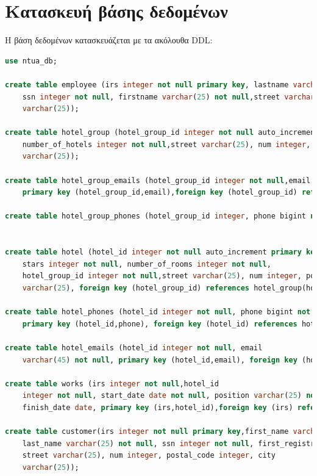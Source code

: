 \documentclass[a4paper,oneside, 11pt]{article}
\begin{document}
\section{Κατασκευή βάσης δεδομένων}
Η βάση δεδομένων κατασκευάζεται με τα ακόλουθα DDL:
\begin{lstlisting}[language=SQL]
use ntua_db;

create table employee (irs integer not null primary key, lastname varchar(25) not null,
	ssn integer not null, firstname varchar(25) not null,street varchar(25), num integer, postal_code integer, city
	varchar(25));

create table hotel_group (hotel_group_id integer not null auto_increment primary key,name varchar(25) not null,
	number_of_hotels integer not null,street varchar(25), num integer, postal_code integer, city
	varchar(25)); 

create table hotel_group_emails (hotel_group_id integer not null,email varchar(45) not null,
	primary key (hotel_group_id,email),foreign key (hotel_group_id) references hotel_group(hotel_group_id) on delete cascade);

create table hotel_group_phones (hotel_group_id integer, phone bigint not null, primary key (hotel_group_id,phone), foreign key (hotel_group_id) references hotel_group(hotel_group_id) on delete cascade);


create table hotel (hotel_id integer not null auto_increment primary key,name varchar(25), 
	stars integer not null, number_of_rooms integer not null,
	hotel_group_id integer not null,street varchar(25), num integer, postal_code integer, city
	varchar(25), foreign key (hotel_group_id) references hotel_group(hotel_group_id) on delete cascade);

create table hotel_phones (hotel_id integer not null, phone bigint not null,
	primary key (hotel_id,phone), foreign key (hotel_id) references hotel(hotel_id) on delete cascade);

create table hotel_emails (hotel_id integer not null, email
	varchar(45) not null, primary key (hotel_id,email), foreign key (hotel_id) references hotel(hotel_id) on delete cascade);

create table works (irs integer not null,hotel_id 
	integer not null, start_date date not null, position varchar(25) not null,
	finish_date date, primary key (irs,hotel_id),foreign key (irs) references employee(irs) on delete cascade, foreign key (hotel_id) references hotel(hotel_id) on delete cascade);

create table customer(irs integer not null primary key,first_name varchar(25) not null,
	last_name varchar(25) not null, ssn integer not null, first_registration date not null, 
	street varchar(25), num integer, postal_code integer, city
	varchar(25));


\end{lstlisting}
\end{document}
